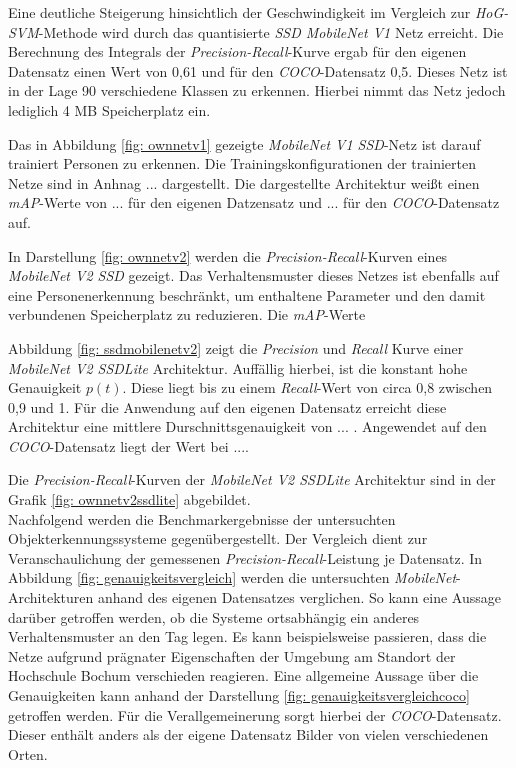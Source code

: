 

Eine deutliche Steigerung hinsichtlich der Geschwindigkeit im Vergleich zur \textit{HoG-SVM}-Methode wird durch das quantisierte \textit{SSD MobileNet V1} Netz erreicht. Die Berechnung des Integrals der \textit{Precision-Recall}-Kurve ergab für den eigenen Datensatz einen Wert von 0,61 und für den \textit{COCO}-Datensatz 0,5. Dieses Netz ist in der Lage 90 verschiedene Klassen zu erkennen. Hierbei nimmt das Netz jedoch lediglich 4 MB Speicherplatz ein.



Das in Abbildung \ref{fig: ownnetv1} gezeigte \textit{MobileNet V1 SSD}-Netz ist darauf trainiert Personen zu erkennen. Die Trainingskonfigurationen der trainierten Netze sind in Anhnag ... dargestellt. Die dargestellte Architektur weißt einen \textit{mAP}-Werte von ... für den eigenen Datzensatz und ... für den \textit{COCO}-Datensatz auf.



In Darstellung \ref{fig: ownnetv2} werden die \textit{Precision-Recall}-Kurven eines \textit{MobileNet V2 SSD} gezeigt. Das Verhaltensmuster dieses Netzes ist ebenfalls auf eine Personenerkennung beschränkt, um enthaltene Parameter und den damit verbundenen Speicherplatz zu reduzieren. Die \textit{mAP}-Werte    



Abbildung \ref{fig: ssdmobilenetv2} zeigt die \textit{Precision} und \textit{Recall} Kurve einer \textit{MobileNet V2 SSDLite} Architektur. Auffällig hierbei, ist die konstant hohe Genauigkeit $p(t)$. Diese liegt bis zu einem \textit{Recall}-Wert von circa 0,8 zwischen 0,9 und 1. Für die Anwendung auf den eigenen Datensatz erreicht diese Architektur eine mittlere Durschnittsgenauigkeit von ... . Angewendet auf den \textit{COCO}-Datensatz liegt der Wert bei .... 

 

 
  
Die \textit{Precision-Recall}-Kurven der \textit{MobileNet V2 SSDLite} Architektur sind in der Grafik \ref{fig: ownnetv2ssdlite} abgebildet. \\

Nachfolgend werden die Benchmarkergebnisse der untersuchten Objekterkennungssysteme gegenübergestellt. Der Vergleich dient zur Veranschaulichung der gemessenen \textit{Precision-Recall}-Leistung je Datensatz. In Abbildung \ref{fig: genauigkeitsvergleich} werden die untersuchten \textit{MobileNet}-Architekturen anhand des eigenen Datensatzes verglichen. So kann eine Aussage darüber getroffen werden, ob die Systeme ortsabhängig ein anderes Verhaltensmuster an den Tag legen. Es kann beispielsweise passieren, dass die Netze aufgrund prägnater Eigenschaften der Umgebung am Standort der Hochschule Bochum verschieden reagieren. Eine allgemeine Aussage über die Genauigkeiten kann anhand der Darstellung \ref{fig: genauigkeitsvergleichcoco} getroffen werden. Für die Verallgemeinerung sorgt hierbei der \textit{COCO}-Datensatz. Dieser enthält anders als der eigene Datensatz Bilder von vielen verschiedenen Orten.     


